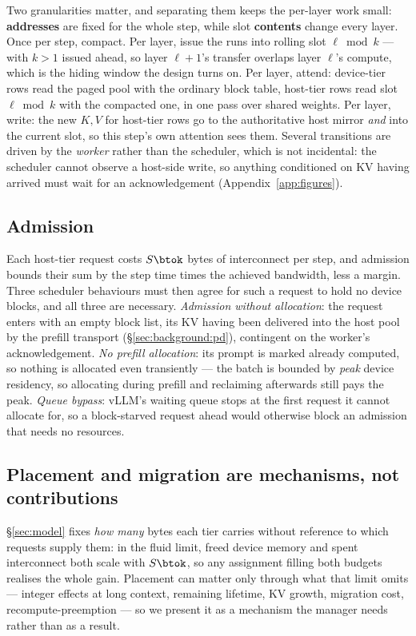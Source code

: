 Two granularities matter, and separating them keeps the per-layer work small:
\textbf{addresses} are fixed for the whole step, while slot \textbf{contents} change
every layer. Once per step, compact. Per layer, issue the runs into rolling slot
$\ell \bmod k$ --- with $k>1$ issued ahead, so layer $\ell{+}1$'s transfer overlaps
layer $\ell$'s compute, which is the hiding window the design turns on. Per layer,
attend: device-tier rows read the paged pool with the ordinary block table,
host-tier rows read slot $\ell \bmod k$ with the compacted one, in one pass over
shared weights. Per layer, write: the new $K,V$ for host-tier rows go to the
authoritative host mirror \emph{and} into the current slot, so this step's own
attention sees them. Several transitions are driven by the \emph{worker} rather than
the scheduler, which is not incidental: the scheduler cannot observe a host-side
write, so anything conditioned on KV having arrived must wait for an acknowledgement
(Appendix~\ref{app:figures}).

\subsection{Admission}
\label{sec:design:admission}

Each host-tier request costs $S\btok$ bytes of interconnect per step, and
admission bounds their sum by the step time times the achieved bandwidth, less a
margin. Three scheduler behaviours must then agree for such a request to hold no
device blocks, and all three are necessary. \emph{Admission without allocation}:
the request enters with an empty block list, its KV having been delivered into
the host pool by the prefill transport (\S\ref{sec:background:pd}), contingent on
the worker's acknowledgement. \emph{No prefill allocation}: its prompt is marked
already computed, so nothing is allocated even transiently --- the batch is
bounded by \emph{peak} device residency, so allocating during prefill and
reclaiming afterwards still pays the peak. \emph{Queue bypass}: vLLM's waiting
queue stops at the first request it cannot allocate for, so a block-starved
request ahead would otherwise block an admission that needs no resources.

\subsection{Placement and migration are mechanisms, not contributions}
\label{sec:design:placement}

\S\ref{sec:model} fixes \emph{how many} bytes each tier carries without reference
to which requests supply them: in the fluid limit, freed device memory and spent
interconnect both scale with $S\btok$, so any assignment filling both budgets
realises the whole gain. Placement can matter only through what that limit omits
--- integer effects at long context, remaining lifetime, KV growth, migration
cost, recompute-preemption --- so we present it as a mechanism the manager needs
rather than as a result.


